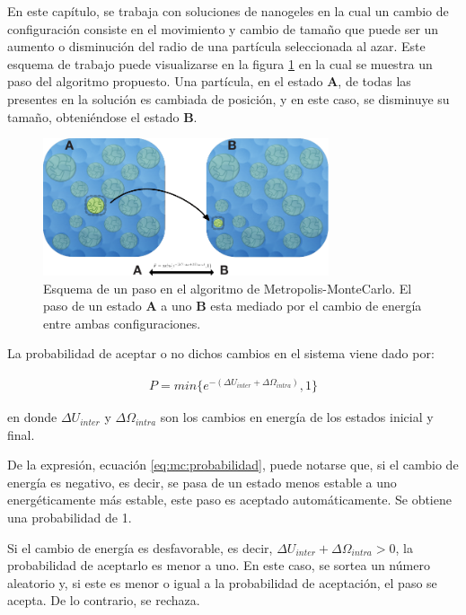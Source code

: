 	En este cap\'itulo, se trabaja con soluciones de nanogeles en la cual un cambio de configuraci\'on consiste en el movimiento y cambio de tama\~no que puede ser un aumento o disminuci\'on  del radio de una part\'icula seleccionada al azar. Este esquema de trabajo puede visualizarse en la figura \ref{fig:mc:pasos_mc} en la cual se muestra un paso del algoritmo propuesto. Una part\'icula, en el estado \textbf{A}, de todas las presentes en la soluci\'on es cambiada de posici\'on, y en este caso, se disminuye su tama\~no, obteni\'endose el estado \textbf{B}.
	
	\begin{figure}[!htb]
		\centering
		\includegraphics[width=0.75\textwidth]{Figures/modelos/mc_model.pdf}
		\caption{Esquema de un paso en el algoritmo de Metropolis-MonteCarlo. El paso de un estado \textbf{A} a uno \textbf{B} esta mediado por el cambio de energ\'ia entre ambas configuraciones. }
		\label{fig:mc:pasos_mc}
	\end{figure}
	
	La probabilidad de aceptar o no dichos cambios en el sistema viene dado por:
	
	\begin{align}
		P = min \{e^{-(\Delta U_{inter} + \Delta \Omega_{intra})},1\}
		\label{eq:mc:probabilidad}
	\end{align}
	
	\noindent en donde $\Delta U_{inter}$ y $\Delta\Omega_{intra}$ son los cambios en energ\'ia de los estados inicial y final. 
	
		De la expresi\'on, ecuaci\'on \ref{eq:mc:probabilidad}, puede notarse que, si el cambio de energ\'ia es negativo, es decir, se pasa de un estado menos estable a uno energ\'eticamente m\'as estable, este paso es aceptado autom\'aticamente. Se obtiene una probabilidad de 1. 
	
	
	Si el cambio de energ\'ia es desfavorable, es decir, $\Delta U_{inter} + \Delta \Omega_{intra} > 0$, la probabilidad de aceptarlo es menor a uno. En este caso, se sortea un n\'umero aleatorio y, si este es menor o igual a la probabilidad de aceptaci\'on, el paso se acepta. De lo contrario, se rechaza. 
	
